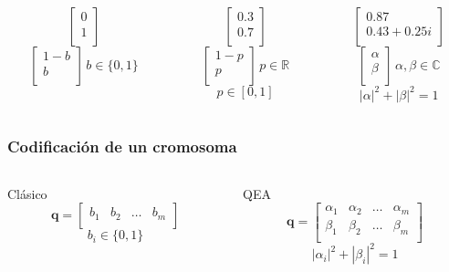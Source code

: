 \documentclass{beamer}
\begin{document}
\begin{frame}[t]
\begin{columns}[c]
	\begin{column}{0.33\textwidth}
		$$ \begin{bmatrix}
			0 \\
			1 \\
			\end{bmatrix} $$
		$$ \begin{bmatrix}
			1-b \\
			b \\
			\end{bmatrix}
			\, b \in \{0, 1\} $$
	\end{column}
	\vrule{}
	\begin{column}{0.33\textwidth}
		$$ \begin{bmatrix}
			0.3 \\
			0.7 \\
			\end{bmatrix} $$
		$$ \begin{bmatrix}
			1-p \\
			p \\
			\end{bmatrix}
			\, p \in \mathbb{R} $$
		$$ p \in [0,1]$$
	\end{column}
	\vrule{}
	\begin{column}{0.33\textwidth}
		$$ \begin{bmatrix}
			0.87 \\
			0.43 + 0.25i \\
			\end{bmatrix} $$
		$$ \begin{bmatrix}
			\alpha \\
			\beta \\
			\end{bmatrix} 
			\, \alpha, \beta \in \mathbb{C} $$
		$$ |\alpha|^2 + |\beta|^2 = 1 $$
	\end{column}
\end{columns}

\end{frame}
\begin{frame}
\frametitle{Codificación de un cromosoma}
\begin{columns}[c]
	\begin{column}{0.5\textwidth}
		\centering
		Clásico
		$$ \mathbf{q} = \begin{bmatrix}
			b_1	& b_2	& \ldots	& b_m\\
		\end{bmatrix} $$
		$$ b_i \in \{0, 1\}$$
	\end{column}
	\vrule{}
	\begin{column}{0.5\textwidth}
		\centering
		QEA
		$$ \mathbf{q} = \begin{bmatrix}
			\alpha_1	& \alpha_2	& \ldots	& \alpha_m\\
			\beta_1		& \beta_2		& \ldots	& \beta_m\\
		\end{bmatrix} $$
		$$ |\alpha_i|^2 + |\beta_i|^2 = 1 $$
	\end{column}
\end{columns}
\end{frame}
\end{document}
